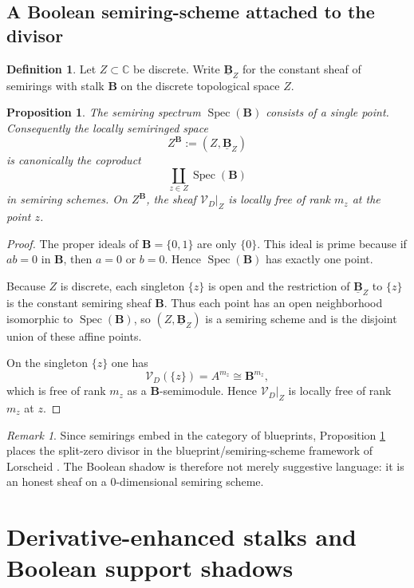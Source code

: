 \documentclass[11pt,a4paper]{article}
\newtheorem{proposition}[theorem]{Proposition}
\theoremstyle{definition}
\newtheorem{definition}[theorem]{Definition}
\theoremstyle{remark}
\newtheorem{remark}[theorem]{Remark}
\DeclareMathOperator{\Spec}{Spec}
\newcommand{\CC}{\mathbb C}
\newcommand{\BB}{\mathbf B}
\begin{document}
\subsection{A Boolean semiring-scheme attached to the divisor}

\begin{definition}
Let $Z\subset\CC$ be discrete.  Write $\underline{\BB}_Z$ for the constant sheaf of semirings with stalk $\BB$ on the discrete topological space $Z$.
\end{definition}

\begin{proposition}\label{prop:specB}
The semiring spectrum $\Spec(\BB)$ consists of a single point.  Consequently the locally semiringed space
\[
Z^{\BB}:=(Z,\underline{\BB}_Z)
\]
is canonically the coproduct
\[
\coprod_{z\in Z}\Spec(\BB)
\]
in semiring schemes.  On $Z^{\BB}$, the sheaf $\mathcal V_D|_Z$ is locally free of rank $m_z$ at the point $z$.
\end{proposition}

\begin{proof}
The proper ideals of $\BB=\{0,1\}$ are only $\{0\}$.  This ideal is prime because if $ab=0$ in $\BB$, then $a=0$ or $b=0$.  Hence $\Spec(\BB)$ has exactly one point.

Because $Z$ is discrete, each singleton $\{z\}$ is open and the restriction of $\underline{\BB}_Z$ to $\{z\}$ is the constant semiring sheaf $\BB$.  Thus each point has an open neighborhood isomorphic to $\Spec(\BB)$, so $(Z,\underline{\BB}_Z)$ is a semiring scheme and is the disjoint union of these affine points.

On the singleton $\{z\}$ one has
\[
\mathcal V_D(\{z\})=A^{m_z}\cong\BB^{m_z},
\]
which is free of rank $m_z$ as a $\BB$-semimodule.  Hence $\mathcal V_D|_Z$ is locally free of rank $m_z$ at $z$.
\end{proof}

\begin{remark}
Since semirings embed in the category of blueprints, Proposition \ref{prop:specB} places the split-zero divisor in the blueprint/semiring-scheme framework of Lorscheid \cite{Lorscheid}.  The Boolean shadow is therefore not merely suggestive language: it is an honest sheaf on a $0$-dimensional semiring scheme.
\end{remark}

\section{Derivative-enhanced stalks and Boolean support shadows}
\end{document}
